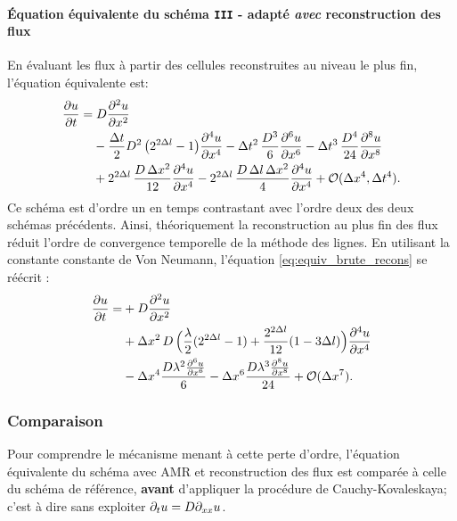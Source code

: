 \paragraph{Équation équivalente du schéma \texttt{III} - adapté \emph{avec} reconstruction des flux}
    En évaluant les flux à partir des cellules reconstruites au niveau le plus fin, l'équation équivalente est:
    \begin{align}\label{eq:equiv_brute_recons}
        \frac{\partial u}{\partial t} =&\; D \frac{\partial^2 u}{\partial x^2} \\\notag
        &- \frac{\Delta t}{2} D^2\, \bigl( 2^{2\Delta l}- 1 \bigr)          \frac{\partial^4 u}{\partial x^4}
        - \Delta t^2\, \frac{D^3}{6}          \frac{\partial^6 u}{\partial x^6}
        - \Delta t^3\, \frac{D^4}{24}         \frac{\partial^8 u}{\partial x^8} \\\notag
        &+ 2^{2\Delta l}\, \frac{D\, \Delta x^2}{12}    \frac{\partial^4 u}{\partial x^4}
        - 2^{2\Delta l}\, \frac{D\, \Delta l\, \Delta x^2}{4} \frac{\partial^4 u}{\partial x^4} + \mathcal{O}(\Delta x^4 , \Delta t^4).
    \end{align}
    Ce schéma est d'ordre un en temps contrastant avec l'ordre deux des deux schémas précédents.
    Ainsi, théoriquement la reconstruction au plus fin des flux réduit l'ordre de convergence temporelle de la méthode des lignes.
    En utilisant la constante constante de Von Neumann, l'équation \eqref{eq:equiv_brute_recons} se réécrit : 
    \begin{align}\label{eq:equiv_cfl_recons}
        \frac{\partial u}{\partial t}
        =&+ D \frac{\partial^{2}u}{\partial x^{2}}\\\notag
        &+ \Delta x^{2}\, D \, \Bigl( 
        \frac{\lambda}{2} (2^{2 \Delta l} - 1) + \frac{2^{2 \Delta l} }{12} (1 - 3 \Delta l)
        \Bigr)\frac{\partial^{4}u}{\partial x^{4}}\\\notag
        & - \Delta x^{4} \frac{D \lambda^{2} \frac{\partial^{6}u}{\partial x^{6}}}{6} - \Delta x^{6} \frac{D \lambda^{3} \frac{\partial^{8}u}{\partial x^{8}}}{24}
        + \mathcal{O}(\Delta x^7). 
    \end{align}
\subsubsection{Comparaison}
    Pour comprendre le mécanisme menant à cette perte d'ordre,
    l'équation équivalente du schéma avec AMR et reconstruction des flux est comparée à celle du schéma de référence, 
    \textbf{avant} d'appliquer la procédure de Cauchy-Kovaleskaya; c'est à dire sans exploiter $\partial_t u=D \partial_{xx} u$.
